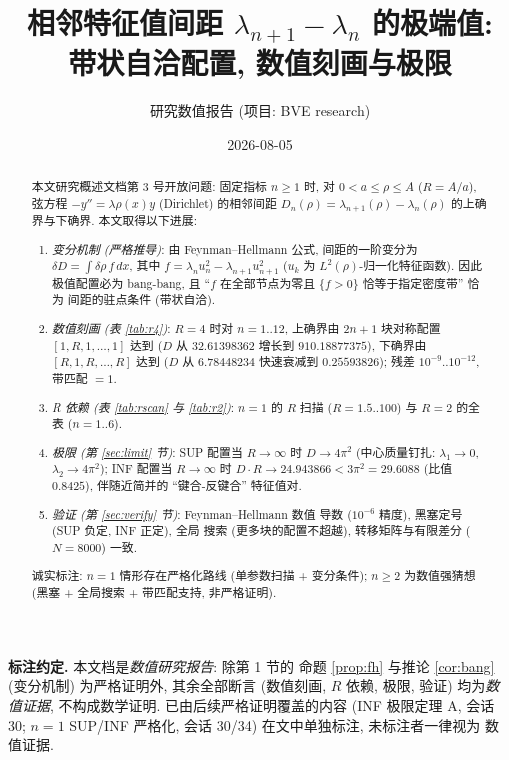 \documentclass[UTF8]{ctexart}
\title{相邻特征值间距 \texorpdfstring{$\lambda_{n+1}-\lambda_n$}{lambda_{n+1}-lambda_n} 的极端值: 带状自洽配置, 数值刻画与极限}
\author{研究数值报告 (项目: BVE research)}
\date{2026-08-05}
\begin{document}
\maketitle

\begin{abstract}
本文研究概述文档第 3 号开放问题: 固定指标 $n \geq 1$ 时, 对 $0 < a \leq \rho \leq A$
($R = A/a$), 弦方程 $-y'' = \lambda\rho(x)y$ (Dirichlet) 的相邻间距
$D_n(\rho) = \lambda_{n+1}(\rho) - \lambda_n(\rho)$ 的上确界与下确界.
本文取得以下进展:
\begin{enumerate}
	\item \emph{变分机制 (严格推导)}: 由 Feynman--Hellmann 公式,
		间距的一阶变分为 $\delta D = \int \delta\rho\, f\, dx$,
		其中 $f = \lambda_n u_n^2 - \lambda_{n+1}u_{n+1}^2$ ($u_k$ 为
		$L^2(\rho)$-归一化特征函数). 因此极值配置必为 bang-bang, 且
		``$f$ 在全部节点为零且 $\{f>0\}$ 恰等于指定密度带'' 恰为
		间距的驻点条件 (带状自洽).
	\item \emph{数值刻画 (表 \ref{tab:r4})}: $R=4$ 时对 $n = 1..12$,
		上确界由 $2n+1$ 块对称配置 $[1, R, 1, \dots, 1]$ 达到
		($D$ 从 $32.61398362$ 增长到 $910.18877375$), 下确界由
		$[R, 1, R, \dots, R]$ 达到 ($D$ 从 $6.78448234$ 快速衰减到
		$0.25593826$); 残差 $10^{-9}..10^{-12}$, 带匹配 $= 1$.
	\item \emph{R 依赖 (表 \ref{tab:rscan} 与 \ref{tab:r2})}: $n=1$ 的
		$R$ 扫描 ($R=1.5..100$) 与 $R=2$ 的全表 ($n=1..6$).
	\item \emph{极限 (第 \ref{sec:limit} 节)}: SUP 配置当 $R\to\infty$
		时 $D \to 4\pi^2$ (中心质量钉扎: $\lambda_1 \to 0$,
		$\lambda_2 \to 4\pi^2$); INF 配置当 $R\to\infty$ 时
		$D\cdot R \to 24.943866 < 3\pi^2 = 29.6088$ (比值 $0.8425$),
		伴随近简并的 ``键合-反键合'' 特征值对.
	\item \emph{验证 (第 \ref{sec:verify} 节)}: Feynman--Hellmann 数值
		导数 ($10^{-6}$ 精度), 黑塞定号 (SUP 负定, INF 正定), 全局
		搜索 (更多块的配置不超越), 转移矩阵与有限差分 ($N=8000$) 一致.
\end{enumerate}
诚实标注: $n = 1$ 情形存在严格化路线 (单参数扫描 + 变分条件);
$n \geq 2$ 为数值强猜想 (黑塞 + 全局搜索 + 带匹配支持, 非严格证明).
\end{abstract}

\medskip
\noindent\textbf{标注约定.} 本文档是\emph{数值研究报告}: 除第 1 节的
命题 \ref{prop:fh} 与推论 \ref{cor:bang} (变分机制) 为严格证明外,
其余全部断言 (数值刻画, $R$ 依赖, 极限, 验证) 均为\emph{数值证据},
不构成数学证明. 已由后续严格证明覆盖的内容 (INF 极限定理 A, 会话 30;
$n=1$ SUP/INF 严格化, 会话 30/34) 在文中单独标注, 未标注者一律视为
数值证据.
\end{document}
